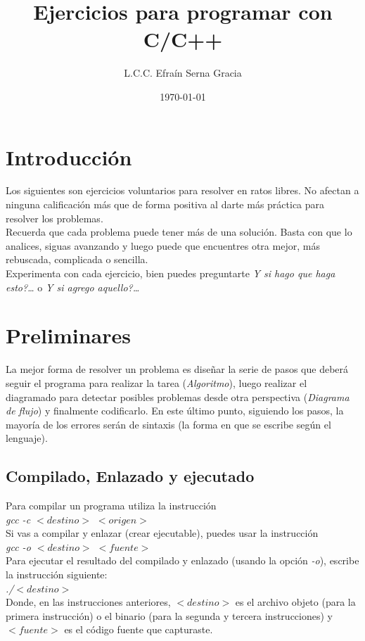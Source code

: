 \documentclass[12pt,spanish,lettersize,twocolumn]{article}
\title{\color{Maroon}Ejercicios para programar con C/C++}
\author{L.C.C. Efra\'in Serna Gracia}
\date{\color{gray}\today}
\begin{document}
\maketitle
\section{Introducci\'on}
Los siguientes son ejercicios voluntarios para resolver en ratos libres. No afectan a ninguna calificaci\'on m\'as que de forma positiva al darte m\'as pr\'actica para resolver los problemas.\\
Recuerda que cada problema puede tener m\'as de una soluci\'on. Basta con que lo analices, siguas avanzando y luego puede que encuentres otra mejor, m\'as rebuscada, complicada o sencilla.\\
Experimenta con cada ejercicio, bien puedes preguntarte \emph{Y si hago que haga esto?\ldots} o \emph{Y si agrego aquello?\ldots}
\section{Preliminares}
La mejor forma de resolver un problema es dise\~nar la serie de pasos que deber\'a seguir el programa para realizar la tarea (\emph{Algoritmo}), luego realizar el diagramado para detectar posibles problemas desde otra perspectiva (\emph{Diagrama de flujo}) y finalmente codificarlo. En este \'ultimo punto, siguiendo los pasos, la mayor\'ia de los errores ser\'an de sintaxis (la forma en que se escribe seg\'un el lenguaje).
\subsection{Compilado, Enlazado y ejecutado}
Para compilar un programa utiliza la instrucci\'on\\
\emph{gcc -c $< destino>$ $<origen>$}\\

Si vas a compilar y enlazar (crear ejecutable), puedes usar la instrucci\'on\\
\emph{gcc -o $<destino>$ $<fuente>$}\\

Para ejecutar el resultado del compilado y enlazado (usando la opci\'on \emph{-o}), escribe la instrucci\'on siguiente:\\
\emph{./$<destino>$}\\

Donde, en las instrucciones anteriores, $<destino>$ es el archivo objeto (para la primera instrucci\'on) o el binario (para la segunda y tercera instrucciones) y $<fuente>$ es el c\'odigo fuente que capturaste.
\end{document}

